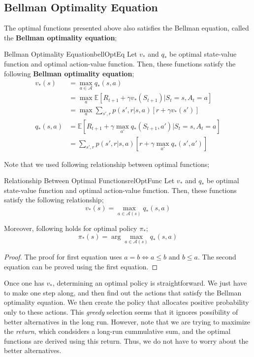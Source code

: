 \documentclass[../../main.tex]{subfiles}
\begin{document}
    \subsection{Bellman Optimality Equation}
    The optimal functions presented above also satisfies the Bellman equation, called the \textbf{Bellman optimality equation};
    \begin{thm}{Bellman Optimality Equation}{bellOptEq}
        Let $v_*$ and $q_*$ be optimal state-value function and optimal action-value function. Then, these functions satisfy the following \textbf{Bellman optimality equation};
        \begin{align}
            v_*(s) &= \max_{a \in \mathcal{A}}q_*(s,a) \\
            &= \max_a \mathbb{E}[R_{t+1} + \gamma v_*(S_{t+1})|S_t=s,A_t=a] \\
            &= \max_a \sum_{s',r}p(s',r|s,a)[r + \gamma v_*(s')]\\
            q_*(s,a) &= \mathbb{E}[R_{t+1} + \gamma \max_{a'}q_*(S_{t+1},a')|S_t=s,A_t=a] \\
            &= \sum_{s',r}p(s',r|s,a)[r + \gamma \max_{a'}q_*(s',a')]
        \end{align}
    \end{thm}
    Note that we used following relationship between optimal functions;
    \begin{thm}{Relationship Between Optimal Functions}{relOptFunc}
        Let $v_*$ and $q_*$ be optimal state-value function and optimal action-value function. Then, these functions satisfy the following relationship;
        \begin{equation}
            v_*(s)=\max_{a \in \mathcal{A}(s)}q_*(s,a)
        \end{equation}

        Moreover, following holds for optimal policy $\pi_*$;
        \begin{equation}
            \pi_*(s) = \arg\max_{a \in \mathcal{A}(s)}q_*(s,a)
        \end{equation}
    \end{thm}
    \begin{proof}
        The proof for first equation uses $a=b \Leftrightarrow  a \leq b \text{ and } b \leq a$. The second equation can be proved using the first equation.
    \end{proof}

    Once one has $v_*$, determining an optimal policy is straightforward. We just have to make one step along, and then find out the actions that satisfy the Bellman optimality equation.
    We then create the policy that allocates positive probability only to these actions. 
    This \emph{greedy} selection seems that it ignores possibility of better alternatives in the long run. However, note that we are trying to maximize the \emph{return}, which
    condsiders a long-run cummulative sum, and the optimal functions are derived using this return. Thus, we do not have to worry about the better alternatives.
\end{document}
